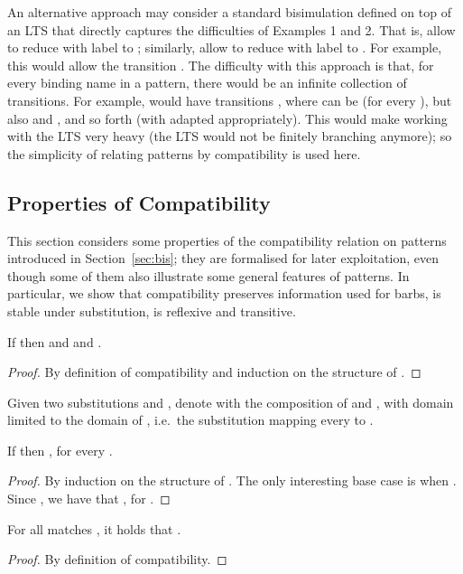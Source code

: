 \documentclass{LMCS}
\begin{document}
An alternative approach may consider a standard bisimulation defined on top of an LTS that directly captures
the difficulties of Examples 1 and 2.
That is, allow  to reduce with label  to ; similarly, allow
 to reduce with label  to . For example, this would allow the transition 
.
The difficulty with this approach is that, for every binding name in a pattern, there would be an
infinite collection of transitions. For example,  would have transitions , 
where  can be  (for every ), but also
 and ,
and so forth (with  adapted appropriately).
This would make working with the LTS very heavy (the LTS would not be finitely branching anymore);
so the simplicity of relating patterns by compatibility is used here.


\subsection{Properties of Compatibility}

This section considers some properties of the compatibility relation on patterns introduced in Section~\ref{sec:bis}; 
they are formalised for later exploitation, even though some of them also illustrate some general features of patterns.
In particular, we show that compatibility preserves information used for barbs, is stable under substitution, is reflexive and transitive.

\begin{lem}
\label{prop:compat-fn}
If  then  and  
and .
\end{lem}
\begin{proof}
By definition of compatibility and induction on the structure of .
\end{proof}


Given two substitutions  and , denote with  
the composition of  and ,
with domain limited to the domain of , 
i.e.\ the substitution mapping every  to .

\begin{lem}
\label{lem:compat-compose-subs}
If  then , for every .
\end{lem}
\begin{proof}
By induction on the structure of . The only interesting base case is when .
Since , we have that
, for .
\end{proof}

\begin{prop}
\label{prop:compat-reflexive}
For all matches , it holds that .
\end{prop}
\begin{proof}
By definition of compatibility.
\end{proof}
\end{document}
